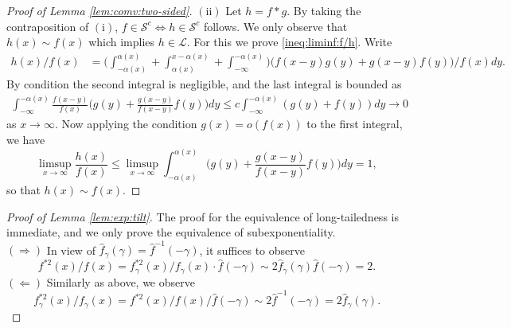 \documentclass[12pt,leqno]{amsart}
\newcommand{\wh}{\widehat}
\newcommand{\cals}{{\mathcal S}}
\newcommand{\call}{{\mathcal L}}
\newcommand{\1}{{\mathbf 1}}
\begin{document}
\begin{proof}[Proof of Lemma \ref{lem:comv:two-sided}]
\noindent 
$(\mathrm{ii})$ Let $h=f\ast g$. By taking the contraposition of $(\mathrm{i})$, $f\in \cals^c \Leftrightarrow h \in \cals^c$ follows. 
We only observe that $h(x)\sim f(x)$ which implies $h\in \call$. For this we prove \eqref{ineq:liminf:f/h}. 
Write 
\begin{align*}
 h(x)/f(x) &= \Big(\int_{-\alpha(x)}^{\alpha(x)} + \int_{\alpha(x)}^{x-\alpha(x)}
+\int_{-\infty}^{-\alpha(x)}
\Big)
\big(
f(x-y)g(y) +g(x-y)f(y)\big)/ f(x) dy. 
\end{align*}
By condition %
the second integral is negligible, and the last integral is bounded as 
\begin{align*}
\int_{-\infty}^{-\alpha(x)} \frac{f(x-y)}{f(x)}
\Big(
g(y)+\frac{g(x-y)}{f(x-y)}f(y)
\Big)dy \le c \int_{-\infty}^{-\alpha(x)} (g(y)+f(y))dy \to 0
\end{align*}
as $x\to\infty$. Now applying the condition $g(x)=o(f(x))$ to the first integral, we have 
\[
 \limsup_{x\to\infty} \frac{h(x)}{f(x)} \le \limsup_{x\to\infty} \int_{-\alpha(x)}^{\alpha(x)} 
\Big(
g(y)+\frac{g(x-y)}{f(x-y)}f(y)
\Big)dy =1,
\]
so that $h(x)\sim f(x)$.
\end{proof}

\begin{proof}[Proof of Lemma \ref{lem:exp:tilt}]
The proof for the equivalence of long-tailedness is immediate, 
and we only prove the equivalence of subexponentiality. \\
$(\Rightarrow)$ In view of $\wh f_\gamma(\gamma) = \wh f^{-1}(-\gamma)$, it suffices to observe 
\[
 f^{\ast 2}(x)/f(x) = f^{\ast 2}_\gamma(x)/f_\gamma(x) \cdot \wh f(-\gamma) \sim 2 \wh f_\gamma(\gamma) \wh f (-\gamma)=2. 
\]
$(\Leftarrow)$ Similarly as above, we observe 
\[
 f^{\ast 2}_\gamma(x)/f_\gamma(x) = f^{\ast 2}(x)/f(x)/ \wh f(-\gamma) \sim 2 \wh f^{-1}(-\gamma) =2 \wh f_\gamma(\gamma). 
\]
\end{proof}

\end{document}
